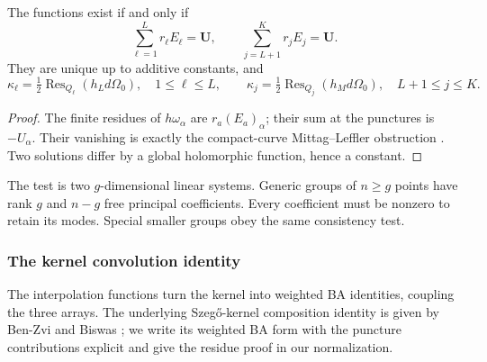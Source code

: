 \begin{lemma}\label{lem:general-BA-interpolation}
The functions exist if and only if
\begin{equation}\label{eq:general-residue-criterion}
 \sum_{\ell=1}^{L}r_{\ell}E_{\ell}=\boldsymbol U,\qquad
 \sum_{j=L+1}^{K}r_jE_j=\boldsymbol U.
\end{equation}
They are unique up to additive constants, and
\begin{equation}\label{eq:general-residue-weights}
 \kappa_{\ell}=\tfrac12\operatorname{Res}_{Q_{\ell}}(h_Ld\Omega_0),\quad1\leq\ell\leq L,
 \qquad
 \kappa_j=\tfrac12\operatorname{Res}_{Q_j}(h_Md\Omega_0),\quad L+1\leq j\leq K.
\end{equation}
\end{lemma}
\begin{proof}
The finite residues of $h\omega_\alpha$ are $r_a(E_a)_\alpha$;
their sum at the punctures is $-U_\alpha$. Their vanishing is exactly
the compact-curve Mittag--Leffler obstruction \cite{Hartshorne1977}.
Two solutions differ by a global holomorphic function, hence a constant.
\end{proof}
The test is two $g$-dimensional linear systems. Generic groups of
$n\geq g$ points have rank $g$ and $n-g$ free principal coefficients.
Every coefficient must be nonzero to retain its modes. Special smaller
groups obey the same consistency test.

\subsubsection{The kernel convolution identity}
\label{sec:kernel-verification}

The interpolation functions turn the kernel into weighted BA identities,
coupling the three arrays. The underlying Szeg\H{o}-kernel composition
identity is given by Ben-Zvi and Biswas
\cite[Proposition~5.2.1]{BenZviBiswas2003}; we write its weighted BA form
with the puncture contributions explicit and give the residue proof in
our normalization.

